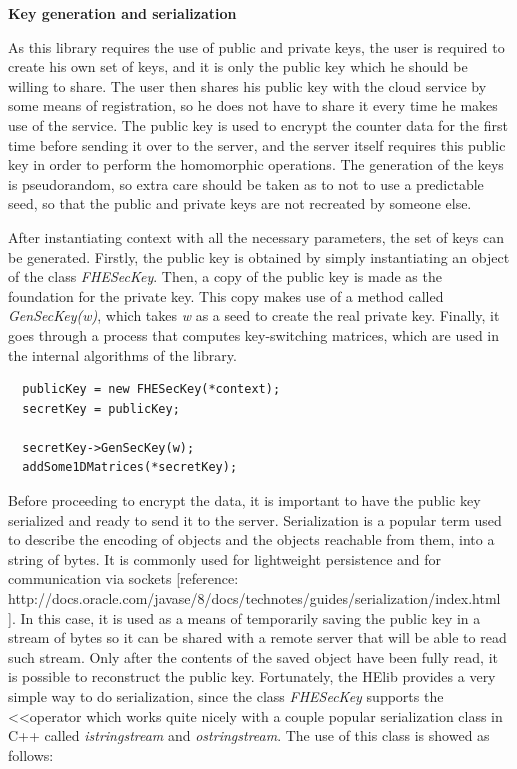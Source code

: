  
 


\textbf{Key generation and serialization}

As this library requires the use of public and private keys, the user is required to create his own set of keys, and it is only the public key which he should be willing to share. The user then shares his public key with the cloud service by some means of registration, so he does not have to share it every time he makes use of the service. The public key is used to encrypt the counter data for the first time before sending it over to the server, and the server itself requires this public key in order to perform the homomorphic operations.
The generation of the keys is pseudorandom, so extra care should be taken as to not to use a predictable seed, so that the public and private keys are not recreated by someone else. 

After instantiating context with all the necessary parameters, the set of keys can be generated. Firstly, the public key is obtained by simply instantiating an object of the class \textit{FHESecKey}. Then, a copy of the public key is made as the foundation for the private key. This copy makes use of a method called \textit{GenSecKey(w)}, which takes \textit{w} as a seed to create the real private key. Finally, it goes through a process that computes key-switching matrices, which are used in the internal algorithms of the library.

\begin{lstlisting}
  publicKey = new FHESecKey(*context);
  secretKey = publicKey;

  secretKey->GenSecKey(w); 
  addSome1DMatrices(*secretKey); 
\end{lstlisting}

Before proceeding to encrypt the data, it is important to have the public key serialized and ready to send it to the server. Serialization is a popular term used to describe the encoding of objects and the objects reachable from them, into a string of bytes. It is commonly used for lightweight persistence and for communication via sockets 
[reference: http://docs.oracle.com/javase/8/docs/technotes/guides/serialization/index.html ]. In this case, it is used as a means of temporarily saving the public key in a stream of bytes so it can be shared with a remote server that will be able to read such stream. Only after the contents of the saved object have been fully read, it is possible to reconstruct the public key. Fortunately, the HElib provides a very simple way to do serialization, since the class 
\textit{FHESecKey} supports the \textless\textless operator which works quite nicely with a couple popular serialization class in C++ called \textit{istringstream} and \textit{ostringstream}. The use of this class is showed as follows: 


